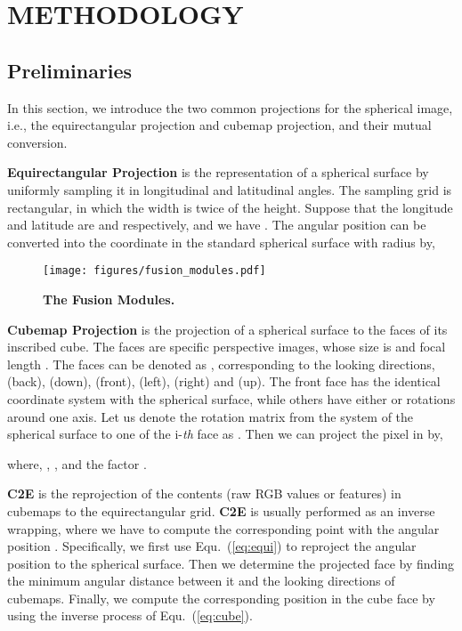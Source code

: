 \documentclass[letterpaper, 10 pt, conference]{ieeeconf}
\begin{document}
\section{METHODOLOGY}
\subsection{Preliminaries}
In this section, we introduce the two common projections for the spherical image, i.e., the equirectangular projection and cubemap projection, and their mutual conversion. 

\textbf{Equirectangular Projection} is the representation of a spherical surface by uniformly sampling it in longitudinal and latitudinal angles. The sampling grid is rectangular, in which the width is twice of the height. Suppose that the longitude and latitude are  and  respectively, and we have . The angular position  can be converted into the coordinate  in the standard spherical surface with radius  by, 




\begin{figure*}[t]
\vspace{5pt}
\begin{center}
\texttt{[image: figures/fusion\_modules.pdf]}
\end{center}
\caption{\textbf{The Fusion Modules.} }
\label{fig:modules}
\end{figure*}




\textbf{Cubemap Projection} is the projection of a spherical surface to the  faces of its inscribed cube. The  faces are specific perspective images, whose size is  and focal length . The  faces can be denoted as , corresponding to the looking directions, (back), (down), (front), (left), (right) and (up). The front face has the identical coordinate system with the spherical surface, while others have either  or  rotations around one axis. Let us denote the rotation matrix from the system of the spherical surface to one of the i-\textit{th} face as . Then we can project the pixel  in  by, 

where, , , and the factor .




\textbf{C2E} is the reprojection of the contents (raw RGB values or features) in cubemaps to the equirectangular grid. \textbf{C2E} is usually performed as an inverse wrapping, where we have to compute the corresponding point with the angular position . Specifically, we first use Equ.~(\ref{eq:equi}) to reproject the angular position to the spherical surface. Then we determine the projected face by finding the minimum angular distance between it and the looking directions of cubemaps. Finally, we compute the corresponding position in the cube face by using the inverse process of Equ.~(\ref{eq:cube}). 
\end{document}
